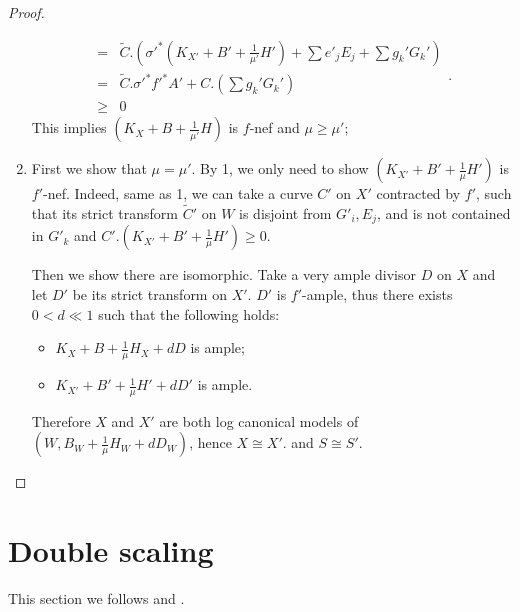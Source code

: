 \documentclass{article}
\begin{document}
\begin{proof}
\begin{enumerate}
\[\begin{aligned}
          =&\tilde{C}.\left(\sigma'^*\left(K_{X'}+B'+\frac{1}{\mu'}H'\right)+\sum e'_jE_j+ \sum g_k'G_k'\right)\\
          =&\tilde{C}.\sigma'^*f'^*A'+C.\left(\sum g_k'G_k'\right)\\
          \geqslant&0
        \end{aligned}
      .\]
     This implies $ (K_X+B+\frac{1}{\mu'}H) $ is $ f $-nef and $ \mu\geqslant \mu' $;
   \item  First we show that $ \mu=\mu' $. By 1, we only need to show $ (K_{X'}+B'+\frac{1}{\mu}H') $ is $ f' $-nef. Indeed,  same as 1, we can take a curve $ C' $ on $X'$ contracted by $f'$, such that its strict transform $\tilde{C}'$ on $W$ is disjoint from  $ G'_i, E_j $, and is not contained in $ G'_k $ and 
     $C'.\left(K_{X'}+B'+\frac{1}{\mu}H'\right)\geqslant 0$.

Then we show there are isomorphic. Take a very ample divisor $ D $ on $ X $ and let $ D'  $ be its strict transform on $ X' $. $ D' $ is $ f' $-ample, thus there exists $ 0<d\ll1 $ such that the following holds:
      \begin{itemize}
        \item $ K_X+B+\frac{1}{\mu }H_X+dD $ is ample;
        \item $ K_{X'}+B'+\frac{1}{\mu }H'+dD' $ is ample.
      \end{itemize}
    Therefore $X$ and $X'$ are both log canonical models of $(W,B_{W}+\frac{1}{\mu}H_{W}+dD_{W})$, hence $X\cong X'$. and $S\cong S'$.  
  \end{enumerate} \end{proof}

\section{Double scaling}
This section we follows \cite[13.The Sarkisov program]{haconMinimalModelProgram2012} and  \cite{liuSarkisovProgramGeneralized2019}.
\end{document}
